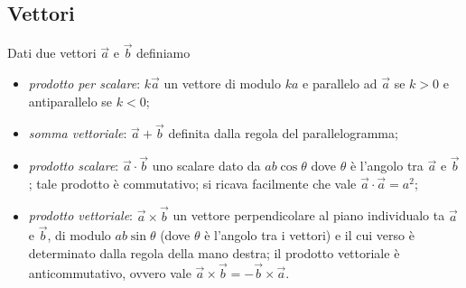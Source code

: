 \subsection{Vettori}
Dati due vettori $ \vec a $ e $ \vec b $ definiamo 
\begin{itemize}
	\item \emph{prodotto per scalare}: $ k \vec a $ un vettore di modulo $ ka $ e parallelo ad $ \vec a $ se $ k > 0 $ e antiparallelo se $ k < 0 $;
	\item \emph{somma vettoriale}: $ \vec a + \vec b $ definita dalla regola del parallelogramma;
	\item \emph{prodotto scalare}: $ \vec a \cdot \vec b $ uno scalare dato da $ ab \cos \theta $ dove $ \theta $ è l'angolo tra $ \vec a $ e $ \vec b $; tale prodotto è commutativo; si ricava facilmente che vale $ \vec a \cdot \vec a = a^2 $; 
	\item \emph{prodotto vettoriale}: $ \vec a \times \vec b $ un vettore perpendicolare al piano individualo ta $ \vec a $ e $ \vec b $, di modulo $ ab \sin \theta $ (dove $ \theta $ è l'angolo tra i vettori) e il cui verso è determinato dalla regola della mano destra; il prodotto vettoriale è anticommutativo, ovvero vale $ \vec a \times \vec b = - \vec b \times \vec a $.
\end{itemize}

